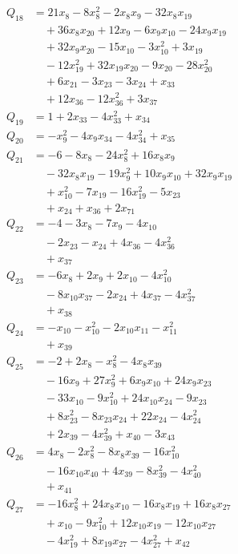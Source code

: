 \begin{align*}
Q_{18}&=21x_{8}-8x_{8}^{2}-2x_{8}x_{9}-32x_{8}x_{19}\\
&\quad +36x_{8}x_{20}+12x_{9}-6x_{9}x_{10}-24x_{9}x_{19}\\
&\quad +32x_{9}x_{20}-15x_{10}-3x_{10}^{2}+3x_{19}\\
&\quad -12x_{19}^{2}+32x_{19}x_{20}-9x_{20}-28x_{20}^{2}\\
&\quad +6x_{21}-3x_{23}-3x_{24}+x_{33}\\
&\quad +12x_{36}-12x_{36}^{2}+3x_{37}\\
Q_{19}&=1+2x_{33}-4x_{33}^{2}+x_{34}\\
Q_{20}&=-x_{9}^{2}-4x_{9}x_{34}-4x_{34}^{2}+x_{35}\\
Q_{21}&=-6-8x_{8}-24x_{8}^{2}+16x_{8}x_{9}\\
&\quad -32x_{8}x_{19}-19x_{9}^{2}+10x_{9}x_{10}+32x_{9}x_{19}\\
&\quad +x_{10}^{2}-7x_{19}-16x_{19}^{2}-5x_{23}\\
&\quad +x_{24}+x_{36}+2x_{71}\\
Q_{22}&=-4-3x_{8}-7x_{9}-4x_{10}\\
&\quad -2x_{23}-x_{24}+4x_{36}-4x_{36}^{2}\\
&\quad +x_{37}\\
Q_{23}&=-6x_{8}+2x_{9}+2x_{10}-4x_{10}^{2}\\
&\quad -8x_{10}x_{37}-2x_{24}+4x_{37}-4x_{37}^{2}\\
&\quad +x_{38}\\
Q_{24}&=-x_{10}-x_{10}^{2}-2x_{10}x_{11}-x_{11}^{2}\\
&\quad +x_{39}\\
Q_{25}&=-2+2x_{8}-x_{8}^{2}-4x_{8}x_{39}\\
&\quad -16x_{9}+27x_{9}^{2}+6x_{9}x_{10}+24x_{9}x_{23}\\
&\quad -33x_{10}-9x_{10}^{2}+24x_{10}x_{24}-9x_{23}\\
&\quad +8x_{23}^{2}-8x_{23}x_{24}+22x_{24}-4x_{24}^{2}\\
&\quad +2x_{39}-4x_{39}^{2}+x_{40}-3x_{43}\\
Q_{26}&=4x_{8}-2x_{8}^{2}-8x_{8}x_{39}-16x_{10}^{2}\\
&\quad -16x_{10}x_{40}+4x_{39}-8x_{39}^{2}-4x_{40}^{2}\\
&\quad +x_{41}\\
Q_{27}&=-16x_{8}^{2}+24x_{8}x_{10}-16x_{8}x_{19}+16x_{8}x_{27}\\
&\quad +x_{10}-9x_{10}^{2}+12x_{10}x_{19}-12x_{10}x_{27}\\
&\quad -4x_{19}^{2}+8x_{19}x_{27}-4x_{27}^{2}+x_{42}\\

\end{align*}
